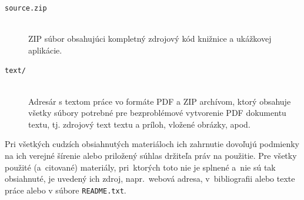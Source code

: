\documentclass[
 program=infpvs,
  language=slovak,
  figures=false,
  tables=false,
  sourcecodes,
  glossaries,
  index
]{kidiplom}
\begin{document}
{\begin{description}
\item[\texttt{source.zip}] \hfill \\
  ZIP súbor obsahujúci kompletný zdrojový kód knižnice a ukážkovej aplikácie.

\item[\texttt{text/}] \hfill \\
  Adresár s textom práce vo formáte PDF a ZIP archívom, ktorý obsahuje všetky súbory potrebné
  pre bezproblémové vytvorenie PDF dokumentu textu, tj. zdrojový text textu a príloh, vložené 
  obrázky, apod.
\end{description}

  
  

Pri všetkých cudzích obsiahnutých materiáloch ich zahrnutie dovoľujú podmienky na ich verejné šírenie alebo priložený súhlas držiteľa práv na použitie. Pre všetky použité (a~citované) materiály, pri~ktorých toto nie je splnené a~nie sú tak obsiahnuté, je uvedený ich zdroj, napr.~webová adresa, v~bibliografii alebo texte práce alebo v súbore \texttt{README.txt}.




}
\end{document}
